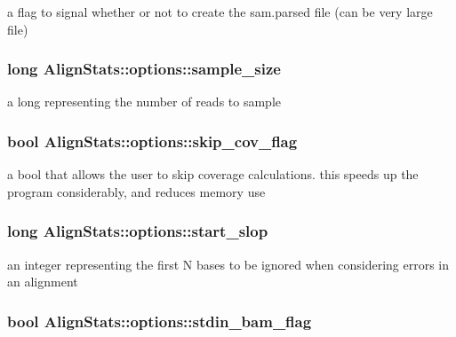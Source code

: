 \label{struct_align_stats_1_1options_a37bd731bc14bf63365db2a82122b0609}
a flag to signal whether or not to create the sam.parsed file (can be very large file) \hypertarget{struct_align_stats_1_1options_ab168ff2db5170e036226d3938e993321}{
\subsubsection[{sample\_\-size}]{\setlength{\rightskip}{0pt plus 5cm}long {\bf AlignStats::options::sample\_\-size}}}
\label{struct_align_stats_1_1options_ab168ff2db5170e036226d3938e993321}
a long representing the number of reads to sample \hypertarget{struct_align_stats_1_1options_a83d2e3d53aacd64b8f2cef6f09ae4d2e}{
\subsubsection[{skip\_\-cov\_\-flag}]{\setlength{\rightskip}{0pt plus 5cm}bool {\bf AlignStats::options::skip\_\-cov\_\-flag}}}
\label{struct_align_stats_1_1options_a83d2e3d53aacd64b8f2cef6f09ae4d2e}
a bool that allows the user to skip coverage calculations. this speeds up the program considerably, and reduces memory use \hypertarget{struct_align_stats_1_1options_a90fbedd6612bb1635a9a078619d03bdd}{
\subsubsection[{start\_\-slop}]{\setlength{\rightskip}{0pt plus 5cm}long {\bf AlignStats::options::start\_\-slop}}}
\label{struct_align_stats_1_1options_a90fbedd6612bb1635a9a078619d03bdd}
an integer representing the first N bases to be ignored when considering errors in an alignment \hypertarget{struct_align_stats_1_1options_a134d6b9c72e42947b581cc9d88c7f219}{
\subsubsection[{stdin\_\-bam\_\-flag}]{\setlength{\rightskip}{0pt plus 5cm}bool {\bf AlignStats::options::stdin\_\-bam\_\-flag}}}
